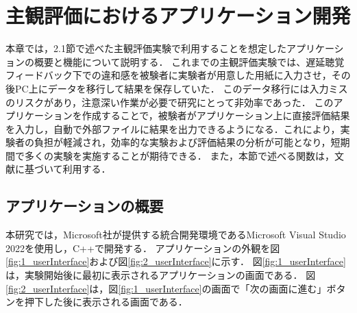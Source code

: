 \chapter{主観評価におけるアプリケーション開発}
本章では，2.1節で述べた主観評価実験で利用することを想定したアプリケーションの概要と機能について説明する．
これまでの主観評価実験では、遅延聴覚フィードバック下での違和感を被験者に実験者が用意した用紙に入力させ，その後PC上にデータを移行して結果を保存していた．
このデータ移行には入力ミスのリスクがあり，注意深い作業が必要で研究にとって非効率であった．
このアプリケーションを作成することで，被験者がアプリケーション上に直接評価結果を入力し，自動で外部ファイルに結果を出力できるようになる．これにより，実験者の負担が軽減され，効率的な実験および評価結果の分析が可能となり，短期間で多くの実験を実施することが期待できる．
また，本節で述べる関数は，文献\cite{Win32API-reference}に基づいて利用する．

\section{アプリケーションの概要}
本研究では，Microsoft社が提供する統合開発環境であるMicrosoft Visual Studio 2022を使用し，C++で開発する．
アプリケーションの外観を図\ref{fig:1_userInterface}および図\ref{fig:2_userInterface}に示す．
図\ref{fig:1_userInterface}は，実験開始後に最初に表示されるアプリケーションの画面である．
図\ref{fig:2_userInterface}は，図\ref{fig:1_userInterface}の画面で「次の画面に進む」ボタンを押下した後に表示される画面である．

